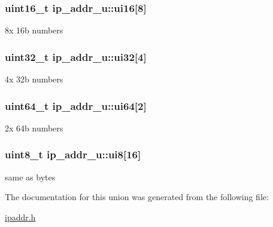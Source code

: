 \subsubsection[{\texorpdfstring{ui16}{ui16}}]{\setlength{\rightskip}{0pt plus 5cm}uint16\+\_\+t ip\+\_\+addr\+\_\+u\+::ui16\mbox{[}8\mbox{]}}\hypertarget{unionip__addr__u_acd437caca826ba90dd3b5a6f6d2427a2}{}\label{unionip__addr__u_acd437caca826ba90dd3b5a6f6d2427a2}
8x 16b numbers 
\subsubsection[{\texorpdfstring{ui32}{ui32}}]{\setlength{\rightskip}{0pt plus 5cm}uint32\+\_\+t ip\+\_\+addr\+\_\+u\+::ui32\mbox{[}4\mbox{]}}\hypertarget{unionip__addr__u_a57b30c62aeb608de1bef3f8b6f3900e3}{}\label{unionip__addr__u_a57b30c62aeb608de1bef3f8b6f3900e3}
4x 32b numbers 
\subsubsection[{\texorpdfstring{ui64}{ui64}}]{\setlength{\rightskip}{0pt plus 5cm}uint64\+\_\+t ip\+\_\+addr\+\_\+u\+::ui64\mbox{[}2\mbox{]}}\hypertarget{unionip__addr__u_ae9423bb3b0d2205c26452ee60c424e87}{}\label{unionip__addr__u_ae9423bb3b0d2205c26452ee60c424e87}
2x 64b numbers 
\subsubsection[{\texorpdfstring{ui8}{ui8}}]{\setlength{\rightskip}{0pt plus 5cm}uint8\+\_\+t ip\+\_\+addr\+\_\+u\+::ui8\mbox{[}16\mbox{]}}\hypertarget{unionip__addr__u_ab172cac802c588284f773c6da88271ba}{}\label{unionip__addr__u_ab172cac802c588284f773c6da88271ba}
same as bytes 

The documentation for this union was generated from the following file\+:\begin{DoxyCompactItemize}
\item 
\hyperlink{ipaddr_8h}{ipaddr.\+h}\end{DoxyCompactItemize}
